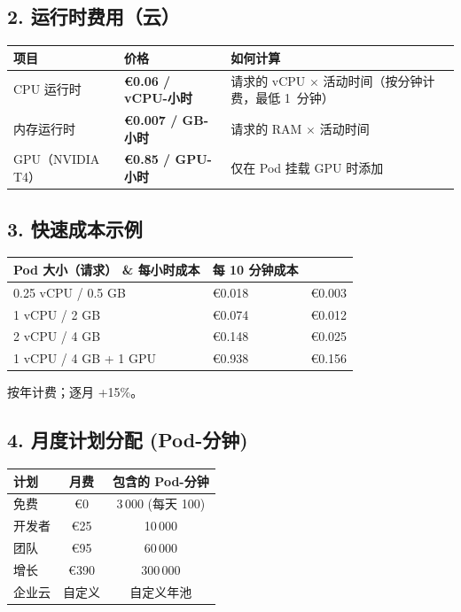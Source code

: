 \documentclass[11pt, a4paper, oneside]{article}
\begin{document}
\subsection*{2. 运行时费用（云）}
\begin{center}
\begin{tabular}{@{}p{4cm}p{4cm}p{6cm}@{}}
\toprule
\textbf{项目} & \textbf{价格} & \textbf{如何计算} \\
\midrule
CPU 运行时 & \textbf{€0.06 / vCPU-小时} & 请求的 vCPU $\times$ 活动时间（按分钟计费，最低 1~分钟） \\
内存运行时 & \textbf{€0.007 / GB-小时} & 请求的 RAM $\times$ 活动时间 \\
GPU（NVIDIA T4） & \textbf{€0.85 / GPU-小时} & 仅在 Pod 挂载 GPU 时添加 \\
\bottomrule
\end{tabular}
\end{center}

\subsection*{3. 快速成本示例}
\begin{center}
\begin{tabular}{@{}lll@{}}
\toprule
\textbf{Pod 大小（请求）} \& \textbf{每小时成本} & \textbf{每 10 分钟成本} \\



\midrule
0.25 vCPU / 0.5 GB & €0.018 & €0.003 \\
1 vCPU / 2 GB & €0.074 & €0.012 \\
2 vCPU / 4 GB & €0.148 & €0.025 \\
1 vCPU / 4 GB + 1 GPU & €0.938 & €0.156 \\
\bottomrule
\end{tabular}
\end{center}

\smallskip
\noindent *按年计费；逐月 +15\%。

\subsection*{4. 月度计划分配 (Pod-分钟)}
\begin{center}
\begin{tabular}{@{}lcc@{}}
\toprule
\textbf{计划} & \textbf{月费} & \textbf{包含的 Pod-分钟} \\
\midrule
免费        & €0    & 3\,000 (每天 100) \\
开发者     & €25   & 10\,000 \\
团队        & €95   & 60\,000 \\
增长        & €390  & 300\,000 \\
企业云     & 自定义  & 自定义年池 \\
\bottomrule
\end{tabular}
\end{center}
\end{document}
